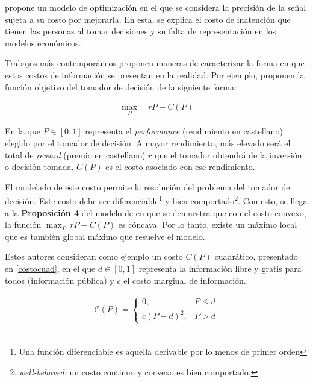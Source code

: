  propone un modelo de optimización en el que se considera la precisión de la señal sujeta a su costo por mejorarla. En esta, se explica el costo de inatención que tienen las personas al tomar decisiones y su falta de representación en los modelos económicos.
\vspace{2.5mm}

Trabajos más contemporáneos proponen maneras de caracterizar la forma en que estos costos de información se presentan en la realidad. Por ejemplo,  proponen la función objetivo del tomador de decisión de la siguiente forma: 

\begin{align}
    \max_{P}\quad rP-C(P)
\end{align}


En la que $P \in [0,1]$ representa el \textit{performance} (rendimiento en castellano) elegido por el tomador de decisión. A mayor rendimiento, más elevado será el total de \textit{reward} (premio en castellano) $r$ que el tomador obtendrá de la inversión o decisión tomada. $C(P)$ es el costo asociado con ese rendimiento. 
\vspace{2.5mm}

El modelado de este costo permite la resolución del problema del tomador de decisión. Este costo debe ser diferenciable\footnote{Una función diferenciable es aquella derivable por lo menos de primer orden} y bien comportado\footnote{\textit{well-behaved:} un costo continuo y convexo es bien comportado. }. Con esto, se llega a la \textbf{Proposición 4} del modelo de  en que se demuestra que con el costo convexo, la función $\max_{P}\, rP-C(P)$ es cóncava. Por lo tanto, existe un máximo local que es también global máximo que resuelve el modelo.
\vspace{2.5mm}

 Estos autores consideran como ejemplo un costo $C(P)$ cuadrático, presentado en \ref{costocuad}, en el que $d \in [0,1]$ representa la información libre y gratis para todos (información pública) y $c$ el costo marginal de información. 

\begin{equation}
\begin{array}{rrclcl}
    {\mathcal{C}}(P)=\begin{cases}0,&P\leq d\\c(P-d)^2,&P>d\end{cases}\label{costocuad}\\
\end{array}
\end{equation}
\vspace{2.5mm}

